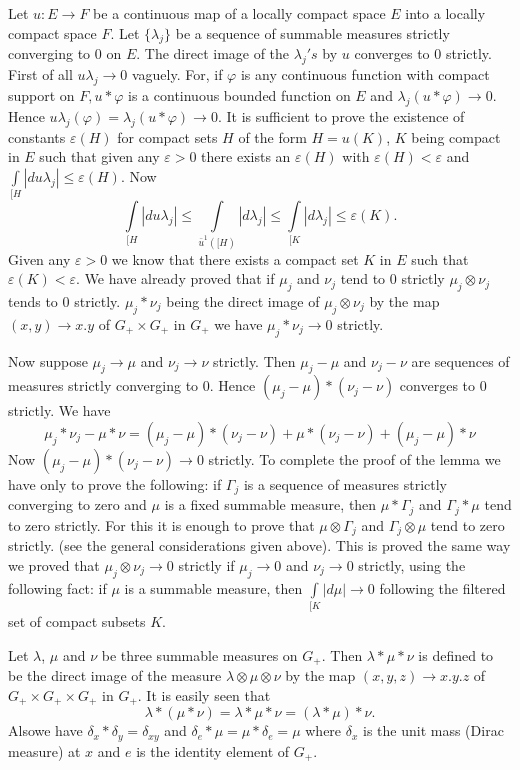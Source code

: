 Let $u : E \to F$ be a continuous map of a locally compact space $E$
into a locally compact space $F$. Let $\{\lambda_j\}$ be a sequence of
summable measures strictly converging to $0$ on $E$. The direct image
of the $\lambda_j's$ by $u$ converges to $0$ strictly. First of all $u
\lambda_j \to 0$ vaguely. For, if $\varphi$ is any continuous function
with compact support on $F, u * \varphi$ is a continuous bounded
function on $E$ and $\lambda_j (u * \varphi) \to 0$. Hence $u
\lambda_j(\varphi)=\lambda_j(u * \varphi) \to 0$. It is sufficient to
prove the existence of constants $\varepsilon(H)$ for compact sets $H$
of the form $H=u(K)$, $K$ being compact in $E$ such that given any
$\varepsilon > 0$ there exists an $\varepsilon(H)$ with
$\varepsilon(H) < \varepsilon$ and $\int\limits_{[H}|d u \lambda_j|
  \leq \varepsilon(H)$. Now\pageoriginale 
$$
\int\limits_{[H}|d u \lambda_j| \leq \int\limits_{\bar{u}^1([H)} |d
    \lambda_j | \leq \int\limits_{[K} |d \lambda_j | \leq
      \varepsilon(K).
$$
Given any $\varepsilon > 0$ we know that there exists a compact set
$K$ in $E$ such that $\varepsilon (K) < \varepsilon$. We have already
proved that if $\mu_j$ and $\nu_j$ tend to $0$ strictly $\mu_j \otimes
\nu_j$ tends to $0$ strictly. $\mu_j * \nu_j$ being the direct image
of $\mu_j \otimes \nu_j$ by the map $(x, y) \to x.y$ of $G_+ \times
G_+$ in $G_+$ we have $\mu_j * \nu_j \to 0$ strictly.

Now suppose $\mu_j \to \mu$ and $\nu_j \to \nu$ strictly. Then $\mu_j
- \mu$ and $\nu_j - \nu$ are sequences of measures strictly converging
to $0$. Hence $(\mu_j - \mu) * (\nu_j - \nu)$ converges to $0$
strictly. We have
$$
\mu_j * \nu_j - \mu * \nu = (\mu_j - \mu) * (\nu_j - \nu) + \mu
*(\nu_j - \nu) + (\mu_j - \mu) * \nu
$$
Now $(\mu_j - \mu) * (\nu_j - \nu) \to 0$ strictly. To complete the
proof of the lemma we have only to prove the following: if $\Gamma_j$
is a sequence of measures strictly converging to zero and $\mu$ is a
fixed summable measure, then $\mu * \Gamma_j$ and $\Gamma_j * \mu$
tend to zero strictly. For this it is enough to prove that $\mu
\otimes \Gamma_j$ and $\Gamma_j \otimes \mu$ tend to zero
strictly. (see the general considerations given above). This is proved
the same way we proved that $\mu_j \otimes \nu_j \to 0$ strictly if
$\mu_j \to 0$ and $\nu_j \to 0$ strictly, using the following fact: if
$\mu$ is a summable measure, then $\int\limits_{[K}|d \mu| \to 0$
  following the filtered set of compact subsets $K$. 

Let $\lambda$, $\mu$ and $\nu$ be three summable measures on
$G_+$. Then $\lambda * \mu * \nu$ is defined to be the direct image of
the measure $\lambda \otimes \mu \otimes \nu$ by the map $(x, y, z)
\to x.y.z$ of $G_+ \times G_+ \times G_+$ in $G_+$. It is easily seen
that 
$$
\lambda * (\mu * \nu) = \lambda * \mu * \nu = ( \lambda * \mu) * \nu .
$$
Also\pageoriginale we have $\delta_x * \delta_y = \delta_{xy}$ and
$\delta_e * \mu = \mu * \delta_e=\mu$ where $\delta_x$ is the unit
mass (Dirac measure) at $x$ and $e$ is the identity element of $G_+$. 
\bigskip

